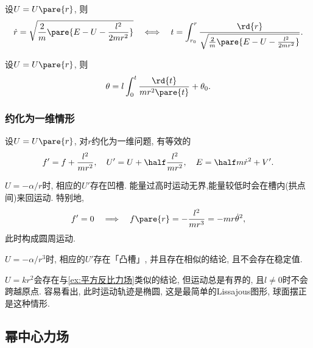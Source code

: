\documentclass[../TheoreticalMechanics.tex]{subfiles}
\begin{document}
\begin{theorem}[径向积分]
	设$U=U\pare{r}$, 则
	\begin{equation}
		\label{eq:径向积分得到时间}
		\dot{r} = \sqrt{\frac{2}{m}\pare{E-U-\frac{l^2}{2mr^2}}} \quad\Longleftrightarrow\quad t = \int_{r_0}^r \frac{\rd{r}}{\sqrt{\frac{2}{m}\pare{E-U-\frac{l^2}{2mr^2}}}}.
	\end{equation}
\end{theorem}
\begin{theorem}[角向积分]
	设$U=U\pare{r}$, 则
	\[ \theta = l\int_0^t \frac{\rd{t}}{mr^2\pare{t}}+\theta_0. \]
\end{theorem}


\subsubsection{约化为一维情形} %
\label{ssub:约化为一维情形}

\begin{finale}
	\begin{theorem}[等效力场与势场]
		设$U=U\pare{r}$, 对$r$约化为一维问题, 有等效的
		\[ f' = f + \frac{l^2}{mr^2},\quad  U' = U + \half\frac{l^2}{mr^2},\quad E = \half m\dot{r}^2 + V'. \]
	\end{theorem}
\end{finale}
\begin{ex}
	\label{ex:平方反比力场}
	$U=-\alpha/r$时, 相应的$U'$存在凹槽. 能量过高时运动无界,能量较低时会在槽内(拱点间)来回运动. 特别地,
	\[ f' = 0 \quad\Longrightarrow\quad f\pare{r} = -\frac{l^2}{mr^3} = -mr\dot{\theta}^2, \]
	此时构成圆周运动.
\end{ex}
\begin{ex}
	$U=-\alpha/r^3$时, 相应的$U'$存在「凸槽」, 并且存在相似的结论, 且不会存在稳定值.
\end{ex}
\begin{ex}
	$U=kr^2$会存在与\cref{ex:平方反比力场}类似的结论, 但运动总是有界的, 且$l\neq 0$时不会跨越原点. 容易看出, 此时运动轨迹是椭圆, 这是最简单的Lissajous图形, 球面摆正是这种情形.
\end{ex}



\subsection{幂中心力场} %
\label{sub:幂中心力场}
\end{document}
